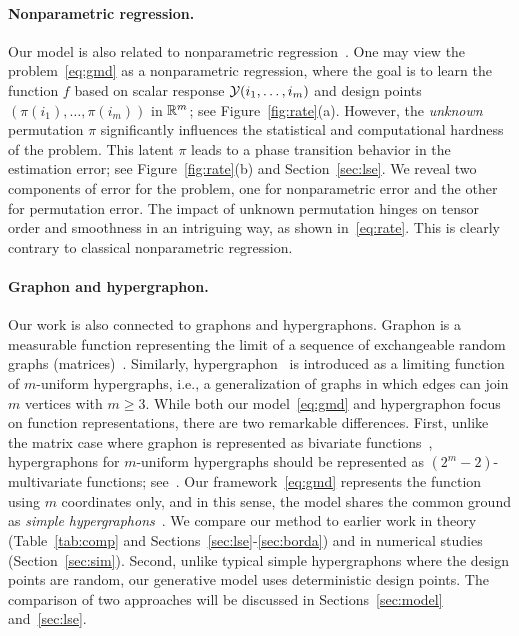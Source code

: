 \documentclass[12pt]{article}
\theoremstyle{definition}
\begin{document}
\paragraph{Nonparametric regression.} Our model is also related to nonparametric regression~\cite{tsybakov2009introduction}. One may view the problem~\eqref{eq:gmd} as a nonparametric regression, where the goal is to learn the function $f$ based on scalar response $\mathcal{Y}(i_1,\ldots,i_m)$ and design points $(\pi({i_1}),\ldots,\pi({i_m}))$ in $\mathbb{R}^m$; see Figure~\ref{fig:rate}(a). However, the \emph{unknown} permutation $\pi$ significantly influences the statistical and computational hardness of the problem. This latent $\pi$ leads to a phase transition behavior in the estimation error; see Figure~\ref{fig:rate}(b) and Section~\ref{sec:lse}. We reveal two components of error for the problem, one for nonparametric error and the other for permutation error. The impact of unknown permutation hinges on tensor order and smoothness in an intriguing way, as shown in~\eqref{eq:rate}. This is clearly contrary to classical nonparametric regression. 

\paragraph{Graphon and hypergraphon.} Our work is also connected to graphons and hypergraphons. Graphon is a measurable function representing the limit of a sequence of exchangeable random graphs (matrices)~\cite{klopp2017oracle,gao2015rate,chan2014consistent}. Similarly, hypergraphon~\cite{zhao2015hypergraph,lovasz2012large} is introduced as a limiting function of $m$-uniform hypergraphs, i.e., a generalization of graphs in which edges can join $m$ vertices with $m\geq 3$. While both our model~\eqref{eq:gmd} and hypergraphon focus on function representations, there are two remarkable differences. First, unlike the matrix case where graphon is represented as bivariate functions~\citep{lovasz2012large}, hypergraphons for $m$-uniform hypergraphs should be represented as $(2^m-2)$-multivariate functions; see~\citet[Section 1.2]{zhao2015hypergraph}. Our framework~\eqref{eq:gmd} represents the function using $m$ coordinates only, and in this sense, the model shares the common ground as \emph{simple hypergraphons}~\citep{balasubramanian2021nonparametric}. We compare our method to earlier work in theory (Table~\ref{tab:comp} and Sections~\ref{sec:lse}-\ref{sec:borda}) and in numerical studies (Section~\ref{sec:sim}). Second, {\color{blue}unlike typical simple hypergraphons where the design points are random, our generative model uses deterministic design points. The comparison of two approaches will be discussed in Sections~\ref{sec:model} and~\ref{sec:lse}.}
\end{document}
